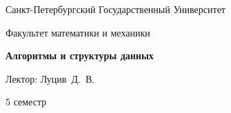 \begin{titlepage}
	\centering
	
	{\Large Санкт-Петербургский Государственный Университет \par}
	
	\vspace{0.5cm}
	
	{\large Факультет математики и механики\par}
	
	\vspace{7.5cm}
	
	{\Huge\bfseries Алгоритмы и структуры данных} %

        \vspace{0.3cm}
	
        {\large Лектор: Луцив~Д.~В.}
        
        \vspace{1cm}
        
        {\Large 5 семестр}


\end{titlepage}